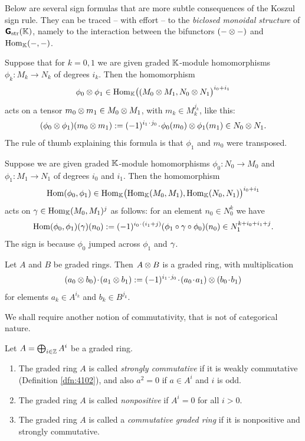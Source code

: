 Below are several sign formulas that are more subtle consequences of the Koszul 
sign rule. They can be traced -- with effort -- to the {\em biclosed monoidal 
structure} of $\boldsymbol{\mathsf{G}}_{\mathrm{str}}(\mathbb{K})$, namely to the interaction between 
the bifunctors $(- \otimes -)$ and $\operatorname{Hom}_{\mathbb{K}}(-, -)$. 

Suppose that for $k = 0, 1$ we are given graded $\mathbb{K}$-module
homomorphisms $\phi_k : M_k \to N_k$ of degrees $i_k$. 
Then the homomorphism 
\[ \phi_0 \otimes \phi_1 \in 
\operatorname{Hom}_{\mathbb{K}} \bigl( (M_0 \otimes M_1, N_0 \otimes N_1 \bigr)^{i_0 + i_1}  \]
acts on a tensor $m_0 \otimes m_1 \in M_0 \otimes M_1$, 
with $m_k \in M_k^{j_k}$, like this: 
\begin{equation} \label{eqn:4105}
(\phi_0 \otimes \phi_1)(m_0 \otimes m_1) := (-1)^{i_1 \mspace{1.5mu}{\cdot}\mspace{1.5mu} j_0} \mspace{1.5mu}{\cdot}\mspace{1.5mu} 
\phi_0(m_0) \otimes \phi_1(m_1) \in N_0 \otimes N_1 .
\end{equation}
The rule of thumb explaining this formula is that $\phi_1$ and $m_0$ were 
transposed. 

Suppose we are given graded $\mathbb{K}$-module
homomorphisms $\phi_0 : N_0 \to M_0$
and $\phi_1 : M_1 \to N_1$ of degrees $i_0$ and $i_1$. 
Then the homomorphism 
\[ \operatorname{Hom}(\phi_0, \phi_1) \in 
\operatorname{Hom}_{\mathbb{K}} \bigl( \operatorname{Hom}_{\mathbb{K}}(M_0, M_1), 
\operatorname{Hom}_{\mathbb{K}}(N_0, N_1) \bigr) ^{i_0 + i_1}  \]
acts on $\gamma \in \operatorname{Hom}_{\mathbb{K}}(M_0, M_1)^j$
as follows: for an element $n_0 \in N^k_0$ we have
\begin{equation} \label{eqn:4106}
\operatorname{Hom}(\phi_0, \phi_1)(\gamma)(n_0) := 
(-1)^{i_0 \mspace{1.5mu}{\cdot}\mspace{1.5mu} (i_1 + j)}(\phi_1 \circ \gamma \circ \phi_0)(n_0) \in 
N_1^{k + i_0 + i_1 + j} . 
\end{equation}
The sign is because $\phi_0$ jumped across $\phi_1$ and $\gamma$. 

\begin{dfn} \label{dfn:4107} 
Let $A$ and $B$ be graded  rings. Then 
$A \otimes B$ is a graded ring, with multiplication 
\[ (a_0 \otimes b_0) \mspace{1.5mu}{\cdot}\mspace{1.5mu} (a_1 \otimes b_1) := 
(-1)^{i_1 \mspace{1.5mu}{\cdot}\mspace{1.5mu} j_0} \mspace{1.5mu}{\cdot}\mspace{1.5mu} (a_0 \mspace{1.5mu}{\cdot}\mspace{1.5mu} a_1) \otimes (b_0 \mspace{1.5mu}{\cdot}\mspace{1.5mu} b_1)  \]
for elements $a_k \in A^{i_k}$ and  $b_k \in B^{j_k}$.
\end{dfn}

We shall require another notion of commutativity, that is not of categorical 
nature. 

\begin{dfn}  \label{dfn:3091} 
Let $A = \bigoplus_{i \in \mathbb{Z}} A^i$ be a graded ring.
\begin{enumerate}
\item The graded ring  $A$ is called 
{\em strongly commutative}%
if it is weakly commutative (Definition \ref{dfn:4102}), 
and also $a^2 = 0$ if $a \in A^i$ and $i$ is odd. 

\item The graded ring $A$ is called {\em nonpositive}%
if $A^i = 0$ for all $i > 0$.

\item The graded ring $A$ is called a 
{\em commutative graded ring}%
if it is nonpositive and strongly commutative. 
\end{enumerate}
\end{dfn}

